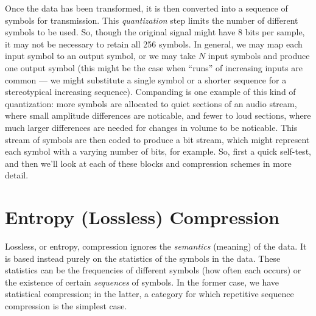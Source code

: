 Once the data has been transformed, it is then converted into a
sequence of symbols for transmission. This \emph{quantization} step
limits the number of different symbols to be used.  So, though the
original signal might have 8 bits per sample, it may not be necessary
to retain all 256 symbols. In general, we may map each input symbol to
an output symbol, or we may take $N$ input symbols and produce one
output symbol (this might be the case when ``runs'' of increasing
inputs are common --- we might substitute a single symbol or a shorter
sequence for a stereotypical increasing sequence). Companding is one
example of this kind of quantization: more symbols are allocated to
quiet sections of an audio stream, where small amplitude differences
are noticable, and fewer to loud sections, where much larger
differences are needed for changes in volume to be noticable.  This
stream of symbols are then coded to produce a bit stream, which might
represent each symbol with a varying number of bits, for example. So,
first a quick self-test, and then we'll look at each of these blocks
and compression schemes in more detail.


\section{Entropy (Lossless) Compression}

Lossless, or entropy, compression ignores the \emph{semantics}
(meaning) of the data. It is based instead purely on the statistics of
the symbols in the data. These statistics can be the frequencies of
different symbols (how often each occurs) or the existence of
certain \emph{sequences} of symbols. In the former case, we have
statistical compression; in the latter, a category for which
repetitive sequence compression is the simplest case.

